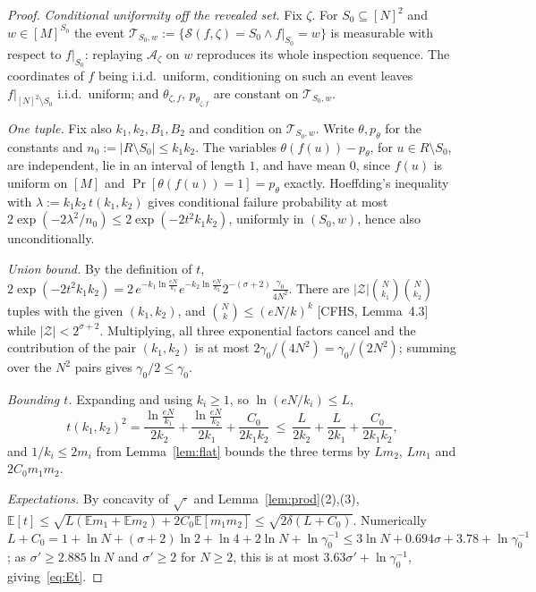 \documentclass{aicr-solution}
\newcommand{\Prob}[1]{\Pr\!\left[#1\right]}
\newcommand{\Exp}{\mathbb{E}}
\begin{document}
\begin{proof}
\emph{Conditional uniformity off the revealed set.} Fix $\zeta$. For
$S_0\subseteq[N]^{2}$ and $w\in[M]^{S_0}$ the event
$\mathcal T_{S_0,w}:=\{\mathcal S(f,\zeta)=S_0\wedge f|_{S_0}=w\}$ is measurable
with respect to $f|_{S_0}$: replaying $\mathcal A_\zeta$ on $w$ reproduces its
whole inspection sequence. The coordinates of $f$ being i.i.d.\ uniform,
conditioning on such an event leaves $f|_{[N]^{2}\setminus S_0}$ i.i.d.\ uniform;
and $\theta_{\zeta,f}$, $p_{\theta_{\zeta,f}}$ are constant on
$\mathcal T_{S_0,w}$.

\emph{One tuple.} Fix also $k_1,k_2,B_1,B_2$ and condition on
$\mathcal T_{S_0,w}$. Write $\theta,p_\theta$ for the constants and
$n_0:=|R\setminus S_0|\le k_1k_2$. The variables $\theta(f(u))-p_\theta$,
for $u\in R\setminus S_0$, are independent, lie in an interval of length $1$, and have
mean $0$, since $f(u)$ is uniform on $[M]$ and
$\Prob{\theta(f(u))=1}=p_\theta$ exactly. Hoeffding's inequality with
$\lambda:=k_1k_2\,t(k_1,k_2)$ gives conditional failure probability at most
$2\exp(-2\lambda^{2}/n_0)\le2\exp(-2t^{2}k_1k_2)$, uniformly in $(S_0,w)$, hence
also unconditionally.

\emph{Union bound.} By the definition of $t$,
$2\exp(-2t^{2}k_1k_2)=2\,e^{-k_1\ln\frac{eN}{k_1}}e^{-k_2\ln\frac{eN}{k_2}}2^{-(\sigma+2)}\frac{\gamma_0}{4N^{2}}$.
There are $|\mathcal Z|\binom{N}{k_1}\binom{N}{k_2}$ tuples with the given
$(k_1,k_2)$, and $\binom{N}{k}\le(eN/k)^{k}$ [CFHS, Lemma~4.3] while
$|\mathcal Z|<2^{\sigma+2}$. Multiplying, all three exponential factors cancel
and the contribution of the pair $(k_1,k_2)$ is at most
$2\gamma_0/(4N^{2})=\gamma_0/(2N^{2})$; summing over the $N^{2}$ pairs gives
$\gamma_0/2\le\gamma_0$.

\emph{Bounding $t$.} Expanding and using $k_i\ge1$, so
$\ln(eN/k_i)\le L$,
\[
  t(k_1,k_2)^2=\frac{\ln\frac{eN}{k_1}}{2k_2}+\frac{\ln\frac{eN}{k_2}}{2k_1}
  +\frac{C_0}{2k_1k_2}\ \le\ \frac{L}{2k_2}+\frac{L}{2k_1}+\frac{C_0}{2k_1k_2},
\]
and $1/k_i\le2m_i$ from Lemma~\ref{lem:flat} bounds the three terms by $Lm_2$,
$Lm_1$ and $2C_0m_1m_2$.

\emph{Expectations.} By concavity of $\sqrt{\cdot}$ and
Lemma~\ref{lem:prod}(2),(3),
$\Exp[t]\le\sqrt{L(\Exp m_1+\Exp m_2)+2C_0\Exp[m_1m_2]}\le\sqrt{2\delta(L+C_0)}$.
Numerically
$L+C_0=1+\ln N+(\sigma+2)\ln2+\ln4+2\ln N+\ln\gamma_0^{-1}\le3\ln N+0.694\sigma+3.78+\ln\gamma_0^{-1}$;
as $\sigma'\ge2.885\ln N$ and $\sigma'\ge2$ for $N\ge2$, this is at most
$3.63\sigma'+\ln\gamma_0^{-1}$, giving~\eqref{eq:Et}.
\end{proof}
\end{document}
